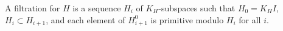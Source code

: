 A filtration for $H$ is a sequence $H_i$ of $K_H$-subspaces such that $H_0 = K_H I$, $H_i \subset H_{i+1}$, and each element of $H_{i+1}^0$ is primitive modulo $H_i$ for all $i$.
